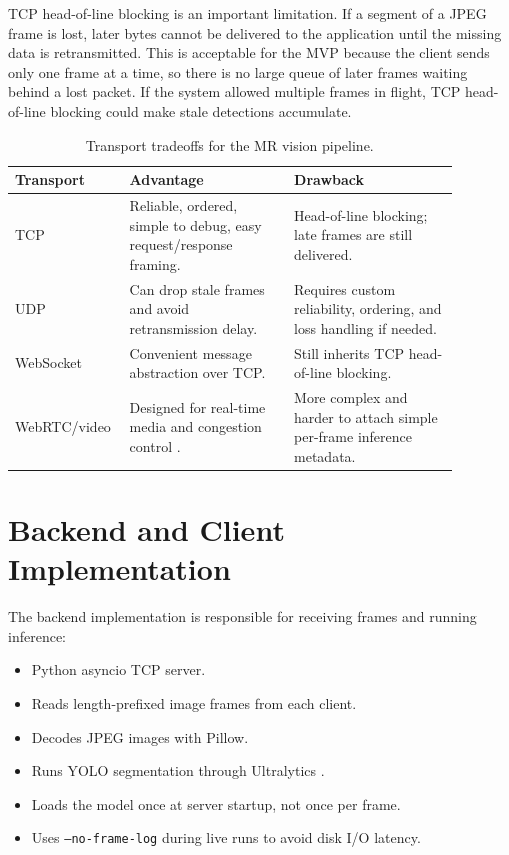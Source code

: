 \documentclass[11pt]{article}
\begin{document}
TCP head-of-line blocking is an important limitation. If a segment of a JPEG frame is lost, later bytes cannot be delivered to the application until the missing data is retransmitted. This is acceptable for the MVP because the client sends only one frame at a time, so there is no large queue of later frames waiting behind a lost packet. If the system allowed multiple frames in flight, TCP head-of-line blocking could make stale detections accumulate.

\begin{table}[H]
\centering
\begin{tabular}{>{\raggedright\arraybackslash}p{0.18\linewidth} >{\raggedright\arraybackslash}p{0.35\linewidth} >{\raggedright\arraybackslash}p{0.35\linewidth}}
\toprule
\textbf{Transport} & \textbf{Advantage} & \textbf{Drawback} \\
\midrule
TCP & Reliable, ordered, simple to debug, easy request/response framing. & Head-of-line blocking; late frames are still delivered. \\
UDP & Can drop stale frames and avoid retransmission delay. & Requires custom reliability, ordering, and loss handling if needed. \\
WebSocket & Convenient message abstraction over TCP. & Still inherits TCP head-of-line blocking. \\
WebRTC/video & Designed for real-time media and congestion control \cite{webrtc-overview}. & More complex and harder to attach simple per-frame inference metadata. \\
\bottomrule
\end{tabular}
\caption{Transport tradeoffs for the MR vision pipeline.}
\end{table}

\section{Backend and Client Implementation}

The backend implementation is responsible for receiving frames and running inference:

\begin{itemize}
    \item Python asyncio TCP server.
    \item Reads length-prefixed image frames from each client.
    \item Decodes JPEG images with Pillow.
    \item Runs YOLO segmentation through Ultralytics \cite{ultralytics-yolo26}.
    \item Loads the model once at server startup, not once per frame.
    \item Uses \texttt{--no-frame-log} during live runs to avoid disk I/O latency.
\end{itemize}
\end{document}
